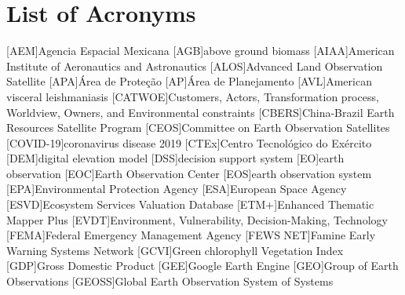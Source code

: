 \setcounter{tocdepth}{4}

\cleardoublepage



\tableofcontents
\newpage
\listoffigures
\newpage
\listoftables
\newpage
\chapter*{List of Acronyms}

\begin{acronym}[HyperLEAVES] \itemsep0pt \setlength{\parskip}{0pt}
[AEM]{Agencia Espacial Mexicana}
[AGB]{above ground biomass}
[AIAA]{American Institute of Aeronautics and Astronautics}
[ALOS]{Advanced Land Observation Satellite}
[APA]{Área de Proteção}
[AP]{Área de Planejamento}
[AVL]{American visceral leishmaniasis}
[CATWOE]{Customers, Actors, Transformation process, Worldview, Owners, and Environmental constraints}
[CBERS]{China-Brazil Earth Resources Satellite Program}
[CEOS]{Committee on Earth Observation Satellites}
[COVID-19]{coronavirus disease 2019}
[CTEx]{Centro Tecnológico do Exército}
[DEM]{digital elevation model}
[DSS]{decision support system}
[EO]{earth observation}
[EOC]{Earth Observation Center}
[EOS]{earth observation system}
[EPA]{Environmental Protection Agency}
[ESA]{European Space Agency}
[ESVD]{Ecosystem Services Valuation Database}
[ETM+]{Enhanced Thematic Mapper Plus}
[EVDT]{Environment, Vulnerability, Decision-Making, Technology}
[FEMA]{Federal Emergency Management Agency}
[FEWS NET]{Famine Early Warning Systems Network}
[GCVI]{Green chlorophyll Vegetation Index}
[GDP]{Gross Domestic Product}
[GEE]{Google Earth Engine}
[GEO]{Group of Earth Observations}
[GEOSS]{Global Earth Observation System of Systems}

\end{acronym}
